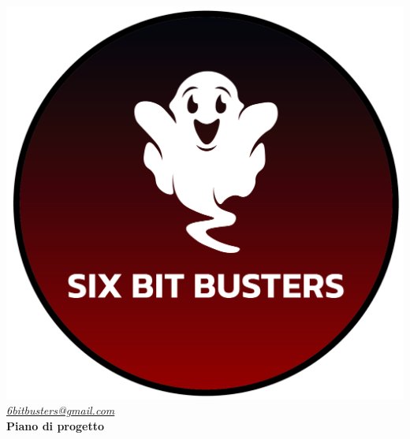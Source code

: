 \thispagestyle{empty}
\renewcommand{\arraystretch}{1.3}


\begin{titlepage}
	\begin{center}
		
	\includegraphics[scale = 0.6]{template/images/logo-circle.png}
	\\[0.8cm]
	\href{mailto:6bitbusters@gmail.com}		      	
	{\large{\textit{6bitbusters@gmail.com} } }\\[0.8cm]
	
	\Huge \textbf{Piano di progetto} \\[0.5cm]


\end{center}
\end{titlepage}
